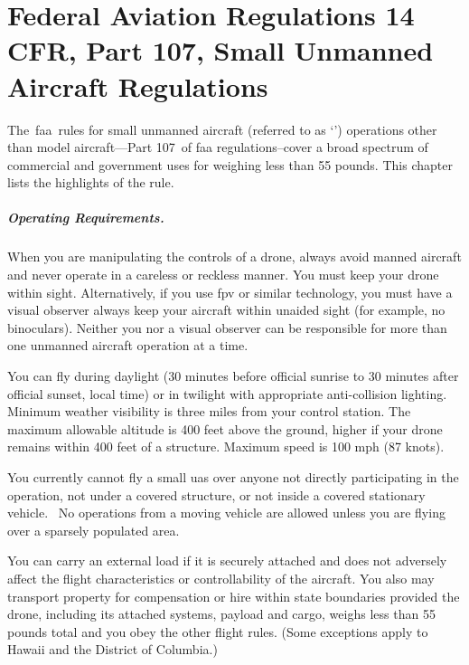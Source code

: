 \chapter[Federal Aviation Regulations 14 CFR 107]{Federal Aviation Regulations 14 CFR, Part 107, Small Unmanned Aircraft Regulations}

The \acrfull{faa} rules for small unmanned aircraft (referred to as `') operations other than model aircraft---Part 107 of \gls{faa} regulations--cover a broad spectrum of commercial and government uses for  weighing less than 55 pounds. This chapter lists the highlights of the rule.

\paragraph{Operating Requirements.} 
When you are manipulating the controls of a drone, always avoid manned aircraft and never operate in a careless or reckless manner. You must keep your drone within sight. Alternatively, if you use \gls{fpv} or similar technology, you must have a visual observer always keep your aircraft within unaided sight (for example, no binoculars). Neither you nor a visual observer can be responsible for more than one unmanned aircraft operation at a time.

You can fly during daylight (30 minutes before official sunrise to 30 minutes after official sunset, local time) or in twilight with appropriate anti-collision lighting. Minimum weather visibility is three miles from your control station. The maximum allowable altitude is 400 feet above the ground, higher if your drone remains within 400 feet of a structure. Maximum speed is 100 mph (87 knots).

You currently cannot fly a small \gls{uas} over anyone not directly participating in the operation, not under a covered structure, or not inside a covered stationary vehicle.  No operations from a moving vehicle are allowed unless you are flying over a sparsely populated area.

You can carry an external load if it is securely attached and does not adversely affect the flight characteristics or controllability of the aircraft. You also may transport property for compensation or hire within state boundaries provided the drone, including its attached systems, payload and cargo, weighs less than 55 pounds total and you obey the other flight rules. (Some exceptions apply to Hawaii and the District of Columbia.)

